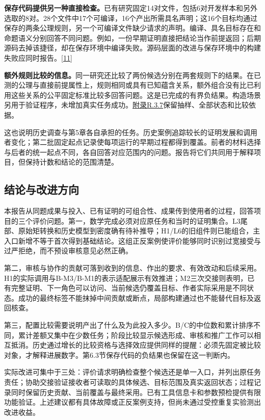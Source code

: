 \textbf{保存代码提供另一种直接检查。}已有研究固定14对文件，包括6对开发样本和另外选取的8对。28个文件中17个可编译，16个产出所需具名声明；这16个目标均通过保存的两条公理规则，另一个可编译文件缺少请求的声明。编译、具名目标存在和命题语义分别回答不同问题。例如，一份早期证明直接把结论当作前提返回；后期源码去掉该捷径，却在保存环境中编译失败。源码层面的改进与保存环境中的构建失败应同时报告。\hyperlink{ref-11}{\mbox{[11]}}

\textbf{额外规则比较的信息。}同一研究还比较了两份候选分别在两套规则下的结果。在已测的公理与直接前提属性上，规则相同或具有已知蕴含关系，额外组合没有比已利用这些关系的公平固定标准比较多回答问题。这是已完成的有界负结果。构造场景另用于验证程序，未增加真实任务成功。\href{zh-appendix.pdf\#r3-7}{附录R.3.7}保留抽样、全部状态和比较依据。

这也说明历史调查与第5章各自承担的任务。历史案例追踪较长的证明发展和调用者变化；第二批固定起点记录使每项运行的早期过程都得到覆盖。前者的材料选择与后者的统一起点不同，各自回答对应范围内的问题。报告将它们共同用于解释项目，但保持计数和结论的范围清楚。

\subsection[结论与改进方向]{\texorpdfstring{\protect\hypertarget{section-6-4}{}结论与改进方向}{结论与改进方向}}
本报告从同题成果与投入、已有证明的可组合性、成果传到使用者的过程，回答项目的三个评价问题。第一，数学完成必须对应原任务和当时的证明集合。L3尾部、原始矩转换和历史模型到密度确有待补推导；H1/L6的旧组件则已能组合，主入口新增不等于首次得到基础结论。这组正反案例使评价能够同时识别过宽接受与过严拒绝，而不预设审核意见必然正确。

第二，审核与协作的贡献可落到收到的信息、作出的要求、有效改动和后续采用。H1的实际调用与B-M3/B-M1的表示适配展示有效推进；M2三次交接则表明，已有完整证明、下一角色可以访问、当前候选仍覆盖目标、作者实际采用是不同状态。成功的最终标签不能抹掉中间贡献或断点，局部构建通过也不能替代目标及返回核查。

第三，配置比较需要说明产出了什么及为此投入多少。B/C的中位数和累计排序不同，累计差额又集中在少数任务；阶段比较显示候选形成、审核和推广工作可以相互抵消。历史通过增长的比较资格与选择效应提供同样的提醒：必须先固定被比较对象，才解释进展数字。第6.3节保存代码的负结果也保留在这一判断内。

实际改进可集中于三处：评价请求明确检查整个候选还是单一入口，并列出原任务责任；协助交接验证接收者可读取的具体候选、目标范围及真实返回状态；过程记录同时保留历史贡献、当前覆盖与最终采用。已有工具信息卡和参数预检提供有限功能验证。上述建议都有具体故障或正反案例支持，但尚未通过受控重复实验测出改进收益。


